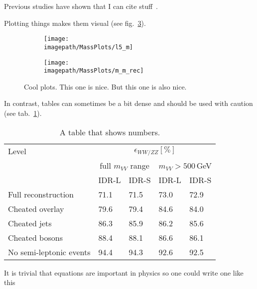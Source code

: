 Previous studies have shown that I can cite stuff~\cite{Fleper:2016frz}.

Plotting things makes them visual (see fig.~\ref{FIG:MassPlotsIDRL}).

\begin{figure}
  \centering
  \begin{subfigure}[t]{0.5\textwidth}
    \centering
    \texttt{[image: \\imagepath/MassPlots/l5\_m]}
    \caption{}
    \label{SUBFIG:IDRL_m}
  \end{subfigure}%
  \begin{subfigure}[t]{0.5\textwidth}
    \centering
    \texttt{[image: \\imagepath/MassPlots/m\_m\_rec]}
    \caption{}
    \label{SUBFIG:IDRL_m_m}
  \end{subfigure}
  \caption{
    Cool plots.
     This one is nice. 
     But this one is also nice.
  }
  \label{FIG:MassPlotsIDRL}
\end{figure}

In contrast, tables can sometimes be a bit dense and should be used with caution (see tab.~\ref{TAB:WWZZSeparationEfficiencies}).

\begin{table}
  \centering
  \caption{
    A table that shows numbers.
  } 
  \label{TAB:WWZZSeparationEfficiencies}
  \begin{tabular}{|l|l|l|l|l|} \hline
    Level & \multicolumn{4}{c|}{$\epsilon_{WW/ZZ} [\%]$} \\ \cline{2-5}
     & \multicolumn{2}{c|}{full $m_{VV}$ range} & \multicolumn{2}{c|}{$m_{VV}>500\,$GeV} \\ \cline{2-5}
     & IDR-L & IDR-S & IDR-L & IDR-S \\ \hline \hline
    Full reconstruction  & 71.1 & 71.5 & 73.0 & 72.9 \\ \hline
    Cheated overlay & 79.6 & 79.4 & 84.6 & 84.0 \\ \hline
    Cheated jets & 86.3 & 85.9 & 86.2 & 85.6 \\ \hline
    Cheated bosons & 88.4 & 88.1 & 86.6 & 86.1 \\ \hline
    No semi-leptonic events & 94.4 & 94.3 & 92.6 & 92.5 \\ \hline
  \end{tabular}
\end{table}

It is trivial that equations are important in physics so one could write one like this

